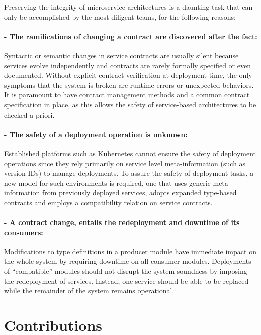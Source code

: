 Preserving the integrity of microservice architectures is a daunting task that can only be accomplished by the most diligent teams, for the following reasons:

\paragraph{- The ramifications of changing a contract are discovered after the fact:}

Syntactic or semantic changes in service contracts are usually silent because services evolve independently and contracts are rarely formally specified or even documented.
Without explicit contract verification at deployment time, the only symptoms that the system is broken are runtime errors or unexpected behaviors.
It is paramount to have contract management methods and a common contract specification in place, as this allows the safety of service-based architectures to be checked a priori.

\paragraph{- The safety of a deployment operation is unknown:}

Established platforms such as Kubernetes cannot ensure the safety of deployment operations since they rely primarily on service level meta-information (such as version IDs) to manage deployments.
To assure the safety of deployment tasks, a new model for such environments is required,
one that uses generic meta-information from previously deployed services, adopts expanded type-based contracts and employs a compatibility relation on service contracts.

\paragraph{- A contract change, entails the redeployment and downtime of its consumers:}

Modifications to type definitions in a producer module have immediate
impact on the whole system by requiring downtime on all consumer modules.
Deployments of “compatible” modules should not disrupt the system soundness by imposing the redeployment of services.
Instead, one service should be able to be replaced while the remainder of the system remains operational.

\section{Contributions} %
\label{sec:contributions}


